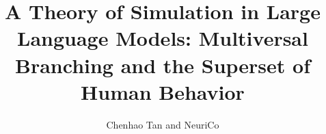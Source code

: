 \documentclass{article}
\title{A Theory of Simulation in Large Language Models: Multiversal Branching and the Superset of Human Behavior}
\author{Chenhao Tan and NeuriCo}
\begin{document}
\maketitle

\begin{abstract}

\end{abstract}









\end{document}
